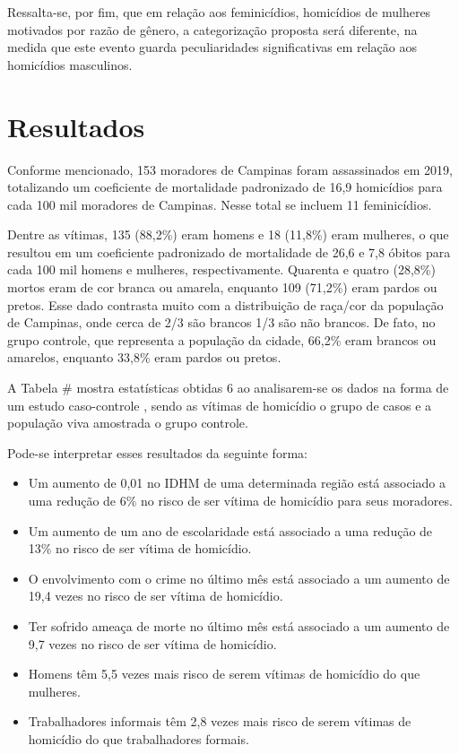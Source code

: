 Ressalta-se, por fim, que em relação aos feminicídios, homicídios de mulheres motivados por razão de gênero, a categorização proposta será diferente, na medida que este evento guarda peculiaridades significativas em relação aos homicídios masculinos.

\section{Resultados}

Conforme mencionado, 153 moradores de Campinas foram assassinados em 2019, totalizando um coeficiente de mortalidade padronizado de 16,9 homicídios para cada 100 mil moradores de Campinas. Nesse total se incluem 11 feminicídios.

Dentre as vítimas, 135 (88,2\%) eram homens e 18 (11,8\%) eram mulheres, o que resultou em um coeficiente padronizado de mortalidade de 26,6 e 7,8 óbitos para cada 100 mil homens e mulheres, respectivamente. Quarenta e quatro (28,8\%) mortos eram de cor branca ou amarela, enquanto 109 (71,2\%) eram pardos ou pretos. Esse dado contrasta muito com a distribuição de raça/cor da população de Campinas, onde cerca de 2/3 são brancos 1/3 são não brancos. De fato, no grupo controle, que representa a população da cidade, 66,2\% eram
brancos ou amarelos, enquanto 33,8\% eram pardos ou pretos.

A Tabela \# mostra estatísticas obtidas 6 ao analisarem-se os dados na forma de um estudo caso-controle \citep{rothman2008modern}, sendo as vítimas de homicídio o grupo de casos e a população viva amostrada o grupo controle.


Pode-se interpretar esses resultados da seguinte forma:

\begin{itemize}
    \item Um aumento de 0,01 no IDHM de uma determinada região está associado a uma redução de 6\% no risco de ser vítima de homicídio para seus moradores.
    \item Um aumento de um ano de escolaridade está associado a uma redução de 13\% no risco de ser vítima de homicídio.
    \item O envolvimento com o crime no último mês está associado a um aumento de 19,4 vezes no risco de ser vítima de homicídio.
    \item Ter sofrido ameaça de morte no último mês está associado a um aumento de 9,7 vezes no risco de ser vítima de homicídio.
    \item Homens têm 5,5 vezes mais risco de serem vítimas de homicídio do que mulheres.
    \item Trabalhadores informais têm 2,8 vezes mais risco de serem vítimas de homicídio do que trabalhadores formais.
\end{itemize}

